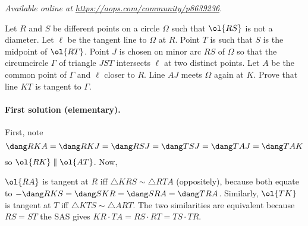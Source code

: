 \textsl{Available online at \url{https://aops.com/community/p8639236}.}
\begin{mdframed}[style=mdpurplebox,frametitle={Problem statement}]
Let $R$ and $S$ be different points on a circle $\Omega$
such that $\ol{RS}$ is not a diameter.
Let $\ell$ be the tangent line to $\Omega$ at $R$.
Point $T$ is such that $S$ is the midpoint of $\ol{RT}$.
Point $J$ is chosen on minor arc $RS$ of $\Omega$ so that
the circumcircle $\Gamma$ of triangle $JST$ intersects $\ell$
at two distinct points.
Let $A$ be the common point of $\Gamma$ and $\ell$ closer to $R$.
Line $AJ$ meets $\Omega$ again at $K$.
Prove that line $KT$ is tangent to $\Gamma$.
\end{mdframed}
\paragraph{First solution (elementary).}
First, note
\[ \dang RKA = \dang RKJ = \dang RSJ = \dang TSJ = \dang TAJ = \dang TAK \]
so $\ol{RK} \parallel \ol{AT}$.
Now,
\begin{itemize}
  \ii $\ol{RA}$ is tangent at $R$ iff $\triangle KRS \sim \triangle RTA$ (oppositely),
  because both equate to $-\dang RKS = \dang SKR = \dang SRA = \dang TRA$.
  \ii Similarly, $\ol{TK}$ is tangent at $T$
  iff $\triangle KTS \sim \triangle ART$.
  \ii The two similarities are equivalent because $RS = ST$
  the SAS gives $KR \cdot TA = RS \cdot RT = TS \cdot TR$.
\end{itemize}

